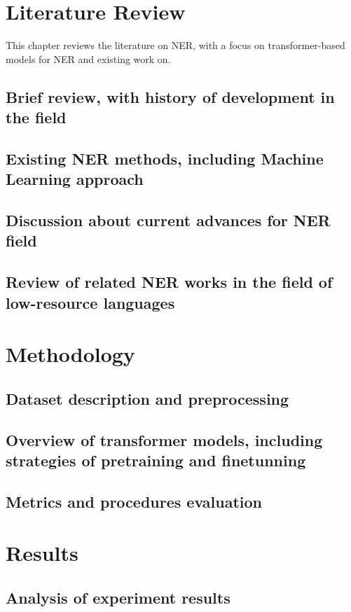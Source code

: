 \documentclass[a4paper,12pt]{report}
\begin{document}
\chapter{Literature Review}\label{cap:literature}
This chapter reviews the literature on NER, with a focus on transformer-based models for NER and existing work on.
\section{Brief review, with history of development in the field}
\section{Existing NER methods, including Machine Learning approach}
\section{Discussion about current advances for NER field}
\section{Review of related NER works in the field of low-resource languages}


\chapter{Methodology}\label{cap:methodology}
\section{Dataset description and preprocessing}
\section{Overview of transformer models, including strategies of pretraining and finetunning}
\section{Metrics and procedures evaluation}


\chapter{Results}\label{cap:results}
\section{Analysis of experiment results}
\end{document}
